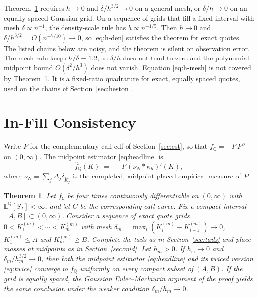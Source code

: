 \documentclass[preprint,12pt,authoryear,times]{elsarticle}
\newtheorem{theorem}{Theorem}
\newcommand{\E}{\mathbb{E}}
\newcommand{\Q}{\mathbb{Q}}
\begin{document}
Theorem~\ref{thm:ifc} requires \(h\to 0\) and \(\delta/h^{3/2}\to 0\) on a general mesh, or \(\delta/h\to 0\) on an equally spaced Gaussian grid. On a sequence of grids that fill a fixed interval with mesh \(\delta\propto n^{-1}\), the density-scale rule has \(h\propto n^{-1/5}\). Then \(h\to 0\) and \(\delta/h^{3/2}=O(n^{-7/10})\to 0\), so \eqref{eq:h-den} satisfies the theorem for exact quotes. The listed chains below are noisy, and the theorem is silent on observation error. The mesh rule keeps \(h/\delta=1.2\), so \(\delta/h\) does not tend to zero and the polynomial midpoint bound \(O(\delta^2/h^3)\) does not vanish. Equation \eqref{eq:h-mesh} is not covered by Theorem~\ref{thm:ifc}. It is a fixed-ratio quadrature for exact, equally spaced quotes, used on the chains of Section~\ref{sec:heston}.


\section{In-Fill Consistency}
\label{sec:ifc}

Write \(P\) for the complementary-call cdf of Section~\ref{sec:est}, so that \(f_{\Q}=-F\,P''\) on \((0,\infty)\). The midpoint estimator \eqref{eq:headline} is
\[
\hat f_{\Q}(K)
\;=\;
-F\,(\nu_N\ast\kappa_h)'(K),
\]
where \(\nu_N=\sum_j\Delta_j\delta_{\tilde K_j}\) is the completed, midpoint-placed empirical measure of \(P\).

\begin{theorem}
\label{thm:ifc}
Let \(f_{\Q}\) be four times continuously differentiable on \((0,\infty)\) with \(\E^{\Q}[S_T]<\infty\), and let \(C\) be the corresponding call curve. Fix a compact interval \([A,B]\subset(0,\infty)\). Consider a sequence of exact quote grids \(0<K_1^{(m)}<\cdots<K_m^{(m)}\) with mesh \(\delta_m=\max_i(K_i^{(m)}-K_{i-1}^{(m)})\to 0\), \(K_1^{(m)}\le A\) and \(K_m^{(m)}\ge B\). Complete the tails as in Section~\ref{sec:tails} and place masses at midpoints as in Section~\ref{sec:mid}. Let \(h_m>0\). If \(h_m\to 0\) and \(\delta_m/h_m^{3/2}\to 0\), then both the midpoint estimator \eqref{eq:headline} and its twiced version \eqref{eq:twice} converge to \(f_{\Q}\) uniformly on every compact subset of \((A,B)\). If the grid is equally spaced, the Gaussian Euler--Maclaurin argument of the proof yields the same conclusion under the weaker condition \(\delta_m/h_m\to 0\).
\end{theorem}
\end{document}

